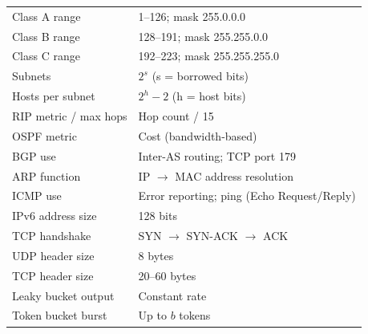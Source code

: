 \documentclass[12pt,a4paper]{article}
\begin{document}
\begin{tcolorbox}[formulabox, title={\textbf{Key Facts at a Glance}}]
\begin{tabularx}{\linewidth}{B{5.0cm} X}
Class A range           & 1--126; mask 255.0.0.0 \\[2pt]
Class B range           & 128--191; mask 255.255.0.0 \\[2pt]
Class C range           & 192--223; mask 255.255.255.0 \\[2pt]
Subnets                 & $2^s$ (s = borrowed bits) \\[2pt]
Hosts per subnet        & $2^h - 2$ (h = host bits) \\[2pt]
RIP metric / max hops   & Hop count / 15 \\[2pt]
OSPF metric             & Cost (bandwidth-based) \\[2pt]
BGP use                 & Inter-AS routing; TCP port 179 \\[2pt]
ARP function            & IP $\to$ MAC address resolution \\[2pt]
ICMP use                & Error reporting; ping (Echo Request/Reply) \\[2pt]
IPv6 address size       & 128 bits \\[2pt]
TCP handshake           & SYN $\to$ SYN-ACK $\to$ ACK \\[2pt]
UDP header size         & 8 bytes \\[2pt]
TCP header size         & 20--60 bytes \\[2pt]
Leaky bucket output     & Constant rate \\[2pt]
Token bucket burst      & Up to $b$ tokens \\[2pt]
\end{tabularx}
\end{tcolorbox}

\vspace{6pt}
\end{document}
